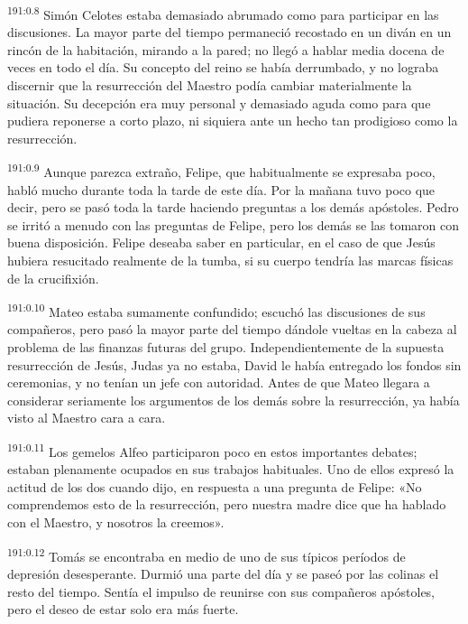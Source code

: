 \par
\textsuperscript{191:0.8} Simón Celotes estaba demasiado abrumado como para participar en las discusiones. La mayor parte del tiempo permaneció recostado en un diván en un rincón de la habitación, mirando a la pared; no llegó a hablar media docena de veces en todo el día. Su concepto del reino se había derrumbado, y no lograba discernir que la resurrección del Maestro podía cambiar materialmente la situación. Su decepción era muy personal y demasiado aguda como para que pudiera reponerse a corto plazo, ni siquiera ante un hecho tan prodigioso como la resurrección.

\par
\textsuperscript{191:0.9} Aunque parezca extraño, Felipe, que habitualmente se expresaba poco, habló mucho durante toda la tarde de este día. Por la mañana tuvo poco que decir, pero se pasó toda la tarde haciendo preguntas a los demás apóstoles. Pedro se irritó a menudo con las preguntas de Felipe, pero los demás se las tomaron con buena disposición. Felipe deseaba saber en particular, en el caso de que Jesús hubiera resucitado realmente de la tumba, si su cuerpo tendría las marcas físicas de la crucifixión.

\par
\textsuperscript{191:0.10} Mateo estaba sumamente confundido; escuchó las discusiones de sus compañeros, pero pasó la mayor parte del tiempo dándole vueltas en la cabeza al problema de las finanzas futuras del grupo. Independientemente de la supuesta resurrección de Jesús, Judas ya no estaba, David le había entregado los fondos sin ceremonias, y no tenían un jefe con autoridad. Antes de que Mateo llegara a considerar seriamente los argumentos de los demás sobre la resurrección, ya había visto al Maestro cara a cara.

\par
\textsuperscript{191:0.11} Los gemelos Alfeo participaron poco en estos importantes debates; estaban plenamente ocupados en sus trabajos habituales. Uno de ellos expresó la actitud de los dos cuando dijo, en respuesta a una pregunta de Felipe: «No comprendemos esto de la resurrección, pero nuestra madre dice que ha hablado con el Maestro, y nosotros la creemos».

\par
\textsuperscript{191:0.12} Tomás se encontraba en medio de uno de sus típicos períodos de depresión desesperante. Durmió una parte del día y se paseó por las colinas el resto del tiempo. Sentía el impulso de reunirse con sus compañeros apóstoles, pero el deseo de estar solo era más fuerte.

